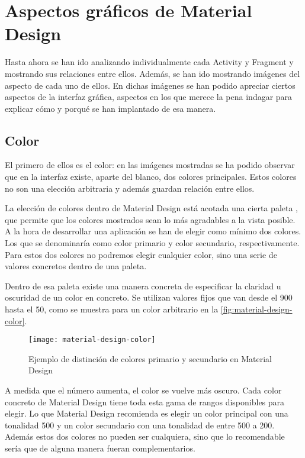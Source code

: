 \section{Aspectos gráficos de Material Design}

Hasta ahora se han ido analizando individualmente cada Activity y Fragment y mostrando sus relaciones entre ellos. Además, se han ido mostrando imágenes del aspecto de cada uno de ellos. En dichas imágenes se han podido apreciar ciertos aspectos de la interfaz gráfica, aspectos en los que merece la pena indagar para explicar cómo y porqué se han implantado de esa manera.

\subsection{Color}

El primero de ellos es el color: en las imágenes mostradas se ha podido observar que en la interfaz existe, aparte del blanco, dos colores principales. Estos colores no son una elección arbitraria y además guardan relación entre ellos.

La elección de colores dentro de Material Design está acotada una cierta paleta \cite{mat-des-color}, que permite que los colores mostrados sean lo más agradables a la vista posible. A la hora de desarrollar una aplicación se han de elegir como mínimo dos colores. Los que se denominaría como color primario y color secundario, respectivamente. Para estos dos colores no podremos elegir cualquier color, sino una serie de valores concretos dentro de una paleta.

Dentro de esa paleta existe una manera concreta de especificar la claridad u oscuridad de un color en concreto. Se utilizan valores fijos que van desde el 900 hasta el 50, como se muestra para un color arbitrario en la \autoref{fig:material-design-color}.

\begin{figure}[H]
	\centering
	\texttt{[image: material-design-color]}
	\caption{Ejemplo de distinción de colores primario y secundario en Material Design}
	\label{fig:material-design-color}
\end{figure}

A medida que el número aumenta, el color se vuelve más oscuro. Cada color concreto de Material Design tiene toda esta gama de rangos disponibles para elegir. Lo que Material Design recomienda es elegir un color principal con una tonalidad 500 y un color secundario con una tonalidad de entre 500 a 200. Además estos dos colores no pueden ser cualquiera, sino que lo recomendable sería que de alguna manera fueran complementarios.

